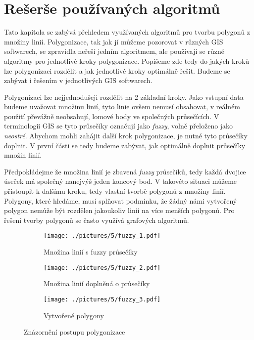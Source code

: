 \chapter{Rešerše používaných algoritmů}
\label{chap:reserzepouzivanychalgoritmu}
	Tato kapitola se zabývá přehledem využívaných algoritmů pro tvorbu polygonů z množiny linií. Polygonizace, tak jak jí můžeme pozorovat v různých GIS softwarech, se zpravidla neřeší jedním algoritmem, ale používají se různé algoritmy pro jednotlivé kroky polygonizace. Popíšeme zde tedy do jakých kroků lze polygonizaci rozdělit a jak jednotlivé kroky optimálně řešit. Budeme se zabývat i řešením v jednotlivých GIS softwarech.

	Polygonizaci lze nejjednodušeji rozdělit na 2 základní kroky. Jako vstupní data budeme uvažovat množinu linií, tyto linie ovšem nemusí obsahovat, v reálném použití převážně neobsahují, lomové body ve společných průsečících. V terminologii GIS se tyto průsečíky označují jako \textit{fuzzy}, volně přeloženo jako \textit{neostré}. Abychom mohli zahájit další krok polygonizace, je nutné tyto průsečíky doplnit. V první části se tedy budeme zabývat, jak optimálně doplnit průsečíky množin linií.
	
	Předpokládejme že množina linií je zbavená \textit{fuzzy} průsečíků, tedy každá dvojice úseček má společný nanejvýš jeden koncový bod. V takovéto situaci můžeme přistoupit k dalšímu kroku, tedy vlastní tvorbě polygonů z množiny linií. Polygony, které hledáme, musí splňovat podmínku, že žádný námi vytvořený polygon nemůže být rozdělen jakoukoliv linií na více menších polygonů. Pro řešení tvorby polygonů se často využívá grafových algoritmů.
	
\begin{figure}[h]
    \centering %
\begin{subfigure}{0.5\textwidth}
  \texttt{[image: ./pictures/5/fuzzy\_1.pdf]}
  \caption{Množina linií s fuzzy průsečíky}
  \label{fig:2-fuzzy_1}
\end{subfigure}\hfil %
\begin{subfigure}{0.5\textwidth}
  \texttt{[image: ./pictures/5/fuzzy\_2.pdf]}
  \caption{Množina linií doplněná o průsečíky}
  \label{fig:2-fuzzy_2}
\end{subfigure}\hfil %
\begin{subfigure}{0.5\textwidth}
  \texttt{[image: ./pictures/5/fuzzy\_3.pdf]}
  \caption{Vytvořené polygony}
  \label{fig:2-fuzzy_2}
\end{subfigure}\hfil %
\caption{Znázornění postupu polygonizace}
\end{figure}

